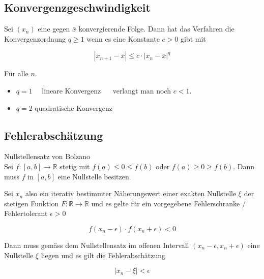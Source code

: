 \subsection{Konvergenzgeschwindigkeit}

Sei $\left(x_{n}\right)$ eine gegen $\bar{x}$ konvergierende Folge. Dann hat das Verfahren die Konvergenzordnung $q \geq 1$ wenn es eine Konstante $c>0$ gibt mit

$$
\left|x_{n+1}-\bar{x}\right| \leq c \cdot\left|x_{n}-\bar{x}\right|^{q}
$$

Für alle $n$.

\begin{itemize}
  \item $q=1 \quad$ lineare Konvergenz $\quad$ verlangt man noch $c<1$.
  \item $q=2$ quadratische Konvergenz
\end{itemize}

\subsection{Fehlerabschätzung}

Nullstellensatz von Bolzano\\
Sei $f:[a, b] \rightarrow \mathbb{R}$ stetig mit $f(a) \leq 0 \leq f(b)$ oder $f(a) \geq 0 \geq f(b)$. Dann muss $f$ in $[a, b]$ eine Nullstelle besitzen.

Sei $x_{n}$ also ein iterativ bestimmter Näherungswert einer exakten Nullstelle $\xi$ der stetigen Funktion $F: \mathbb{R} \rightarrow \mathbb{R}$ und es gelte für ein vorgegebene Fehlerschranke / Fehlertolerant $\epsilon>0$

$$
f\left(x_{n}-\epsilon\right) \cdot f\left(x_{n}+\epsilon\right)<0
$$

Dann muss gemäss dem Nullstellensatz im offenen Intervall $\left(x_{n}-\epsilon, x_{n}+\epsilon\right)$ eine Nullstelle $\xi$ liegen und es gilt die Fehlerabschätzung

$$
\left|x_{n}-\xi\right|<\epsilon
$$
